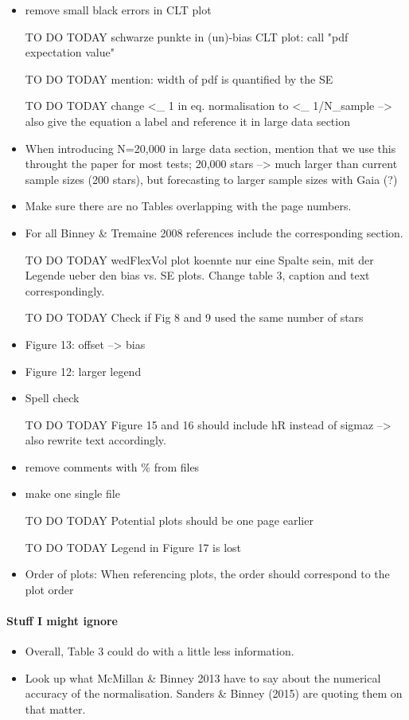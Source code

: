\begin{itemize}
\item remove small black errors in CLT plot
\item [TO DO TODAY] schwarze punkte in (un)-bias CLT plot: call "pdf expectation value"
\item [TO DO TODAY] mention: width of pdf is quantified by the SE
\item [TO DO TODAY] change <_ 1 in eq. normalisation to <_ 1/N_sample --> also give the equation a label and reference it in large data section
\item When introducing N=20,000 in large data section, mention that we use this throught the paper for most tests; 20,000 stars --> much larger than current sample sizes (200 stars), but forecasting to larger sample sizes with Gaia (?)
\item Make sure there are no Tables overlapping with the page numbers.
\item For all Binney \& Tremaine 2008 references include the corresponding section.
\item [TO DO TODAY] wedFlexVol plot koennte nur eine Spalte sein, mit der Legende ueber den bias vs. SE plots. Change table 3, caption and text correspondingly.
\item [TO DO TODAY] Check if Fig 8 and 9 used the same number of stars
\item Figure 13: offset --> bias
\item Figure 12: larger legend
\item Spell check
\item [TO DO TODAY] Figure 15 and 16 should include hR instead of sigmaz --> also rewrite text accordingly.
\item remove comments with \% from files
\item make one single file
\item [TO DO TODAY] Potential plots should be one page earlier
\item [TO DO TODAY] Legend in Figure 17 is lost
\item Order of plots: When referencing plots, the order should correspond to the plot order
\end{itemize}

\paragraph{Stuff I might ignore}
\begin{itemize}
\item Overall, Table 3 could do with a little less information.
\item Look up what McMillan \& Binney 2013 have to say about the numerical accuracy of the normalisation. Sanders \& Binney (2015) are quoting them on that matter.
\end{itemize}


